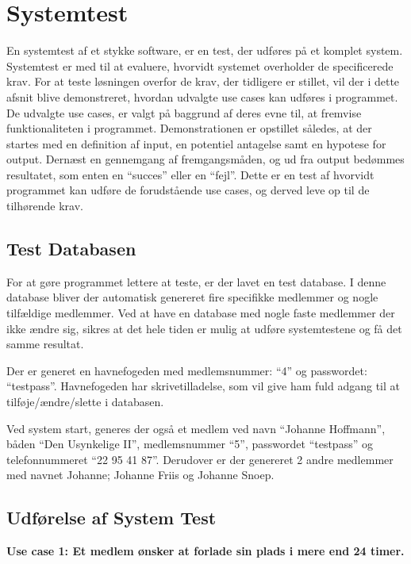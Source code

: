 \section{Systemtest}
En systemtest af et stykke software, er en test, der udføres på et komplet system. Systemtest er med til at evaluere, hvorvidt systemet overholder de specificerede krav. For at teste løsningen overfor de krav, der tidligere er stillet, vil der i dette afsnit blive demonstreret, hvordan udvalgte use cases kan udføres i programmet. De udvalgte use cases, er valgt på baggrund af deres evne til, at fremvise funktionaliteten i programmet. Demonstrationen er opstillet således, at der startes med en definition af input, en potentiel antagelse samt en hypotese for output. Dernæst en gennemgang af fremgangsmåden, og ud fra output bedømmes resultatet, som enten en \enquote{succes} eller en \enquote{fejl}. Dette er en test af hvorvidt programmet kan udføre de forudstående use cases, og derved leve op til de tilhørende krav.

\subsection{Test Databasen}
For at gøre programmet lettere at teste, er der lavet en test database. I denne database bliver der automatisk genereret fire specifikke medlemmer og nogle tilfældige medlemmer. Ved at have en database med nogle faste medlemmer der ikke ændre sig, sikres at det hele tiden er mulig at udføre systemtestene og få det samme resultat. 

Der er generet en havnefogeden med medlemsnummer: \enquote{4} og passwordet: \enquote{testpass}. Havnefogeden har skrivetilladelse, som vil give ham fuld adgang til at tilføje/ændre/slette i databasen.

Ved system start, generes der også et medlem ved navn \enquote{Johanne Hoffmann}, båden \enquote{Den Usynkelige II}, medlemsnummer \enquote{5}, passwordet \enquote{testpass} og telefonnummeret \enquote{22 95 41 87}. Derudover er der genereret 2 andre medlemmer med navnet Johanne; Johanne Friis og Johanne Snoep.

\subsection{Udførelse af System Test}

\textbf{Use case 1: Et medlem ønsker at forlade sin plads i mere end 24 timer.}

